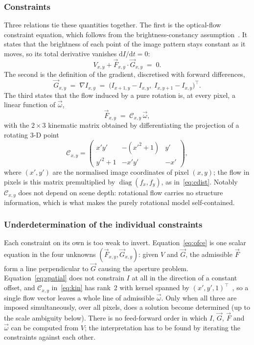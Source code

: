 \documentclass[journal]{IEEEtran}
\newcommand{\Imap}{I}
\newcommand{\Vmap}{V}
\newcommand{\Gmap}{\vec{G}}
\newcommand{\Fmap}{\vec{F}}
\newcommand{\Cmat}{\mathcal{C}}
\newcommand{\wvec}{\vec{\omega}}
\begin{document}
\subsubsection{Constraints}
Three relations tie these quantities together. The first is the optical-flow constraint equation, which follows from the brightness-constancy assumption~\cite{horn1981}. It states that the brightness of each point of the image pattern stays constant as it moves, so its total derivative vanishes
$\mathrm{d}\Imap/\mathrm{d}t = 0$:
\begin{equation}
\Vmap_{x,y} + \Fmap_{x,y}\cdot\Gmap_{x,y} \;=\; 0 .
\label{eq:ofce}
\end{equation}
The second is the definition of the gradient, discretised with forward differences,
\begin{equation}
\Gmap_{x,y} \;=\; \nabla \Imap_{x,y}
 \;=\; \big(\Imap_{x+1,y}-\Imap_{x,y},\; \Imap_{x,y+1}-\Imap_{x,y}\big)^{\!\top}.
\label{eq:spatial}
\end{equation}
The third states that the flow induced by a pure rotation is, at every pixel, a
linear function of $\wvec$,
\begin{equation}
\Fmap_{x,y} \;=\; \Cmat_{x,y}\,\wvec ,
\label{eq:kin}
\end{equation}
with the $2\times3$ kinematic matrix obtained by differentiating the projection of a rotating 3-D point~\cite{martel2019thesis}
\begin{equation}
\Cmat_{x,y} =
\begin{pmatrix}
 x'y' & -(x'^2+1) & y' \\[2pt]
 y'^2+1 & -x'y' & -x'
\end{pmatrix},
\label{eq:cmat}
\end{equation}
where $(x',y')$ are the normalised image coordinates of pixel $(x,y)$; the flow in pixels is this matrix premultiplied by $\operatorname{diag}(f_x,f_y)$, as in~\eqref{eq:cdist}. Notably $\Cmat_{x,y}$ does not depend on scene depth: rotational flow carries no structure information, which is what makes the purely rotational model self-contained.

\subsubsection{Underdetermination of the individual constraints}
Each constraint on its own is too weak to invert. Equation~\eqref{eq:ofce} is one scalar equation in the four unknowns $(\Fmap_{x,y},\Gmap_{x,y})$: given $\Vmap$ and $\Gmap$, the admissible $\Fmap$ form a line perpendicular to $\Gmap$ causing the aperture problem.
Equation~\eqref{eq:spatial} does not constrain $\Imap$ at all in the direction of a constant offset, and $\Cmat_{x,y}$ in~\eqref{eq:kin} has rank~2 with kernel spanned by $(x',y',1)^{\!\top}$~\cite{martel2019thesis}, so a single flow vector leaves a whole line of admissible $\wvec$. Only when all three are imposed simultaneously, over all pixels, does a solution become determined (up to the scale ambiguity below). There is no feed-forward order in which $\Imap$, $\Gmap$, $\Fmap$ and $\wvec$ can be computed from $\Vmap$; the interpretation has to be found by iterating the constraints against each other.
\end{document}
